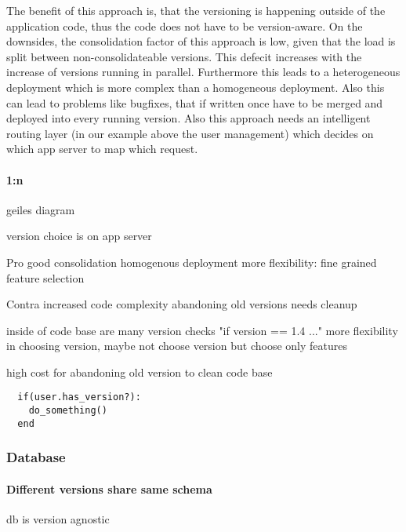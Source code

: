 The benefit of this approach is, that the versioning is happening outside of the application code, thus the code does not have to be version-aware. On the downsides, the consolidation factor of this approach is low, given that the load is split between non-consolidateable versions. This defecit increases with the increase of versions running in parallel. Furthermore this leads to a heterogeneous deployment which is more complex than a homogeneous deployment.  Also this can lead to problems like bugfixes, that if written once have to be merged and deployed into every running version. Also this approach needs an intelligent routing layer (in our example above the user management) which decides on which app server to map which request.

%
%

\paragraph{1:n}
geiles diagram


version choice is on app server


Pro
good consolidation
homogenous deployment
more flexibility: fine grained feature selection

Contra
increased code complexity
abandoning old versions needs cleanup



inside of code base are many version checks "if version == 1.4 ..."
more flexibility in choosing version, maybe not choose version but choose only features

high cost for abandoning old version to clean code base

\lstset{language=Ruby, caption=code snippet, label=code}
\begin{lstlisting}
  if(user.has_version?):
    do_something()
  end
\end{lstlisting}

\subsubsection{Database}

\paragraph{Different versions share same schema}
db is version agnostic

